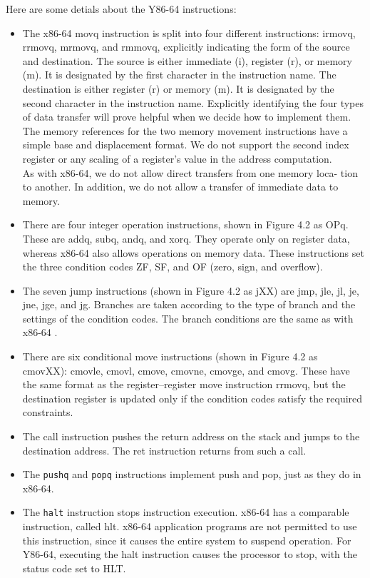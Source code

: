 \documentclass[11pt]{article}
\begin{document}
Here are some detials about the Y86-64 instructions:\\
\begin{itemize}
\item The x86-64 movq instruction is split into four different instructions: irmovq, rrmovq, mrmovq, and rmmovq, explicitly indicating the form of the source and destination. The source is either immediate (i), register (r), or memory (m). It is designated by the first character in the instruction name. The destination is either register (r) or memory (m). It is designated by the second character in the instruction name. Explicitly identifying the four types of data transfer will prove helpful when we decide how to implement them.\\
The memory references for the two memory movement instructions have a simple base and displacement format. We do not support the second index register or any scaling of a register’s value in the address computation.\\
As with x86-64, we do not allow direct transfers from one memory loca- tion to another. In addition, we do not allow a transfer of immediate data to memory.\\
\item There are four integer operation instructions, shown in Figure 4.2 as OPq. These are addq, subq, andq, and xorq. They operate only on register data, whereas x86-64 also allows operations on memory data. These instructions set the three condition codes ZF, SF, and OF (zero, sign, and overflow).\\
\item The seven jump instructions (shown in Figure 4.2 as jXX) are jmp, jle, jl, je, jne, jge, and jg. Branches are taken according to the type of branch and the settings of the condition codes. The branch conditions are the same as with x86-64 .\\
\item There are six conditional move instructions (shown in Figure 4.2 as cmovXX): cmovle, cmovl, cmove, cmovne, cmovge, and cmovg. These have the same format as the register–register move instruction rrmovq, but the destination register is updated only if the condition codes satisfy the required constraints.\\
\item The call instruction pushes the return address on the stack and jumps to the destination address. The ret instruction returns from such a call.\\
\item The \texttt{pushq} and \texttt{popq} instructions implement push and pop, just as they do in x86-64.\\
\item The \texttt{halt} instruction stops instruction execution. x86-64 has a comparable instruction, called hlt. x86-64 application programs are not permitted to use this instruction, since it causes the entire system to suspend operation. For Y86-64, executing the halt instruction causes the processor to stop, with the status code set to HLT.\\
\end{itemize}
\end{document}
